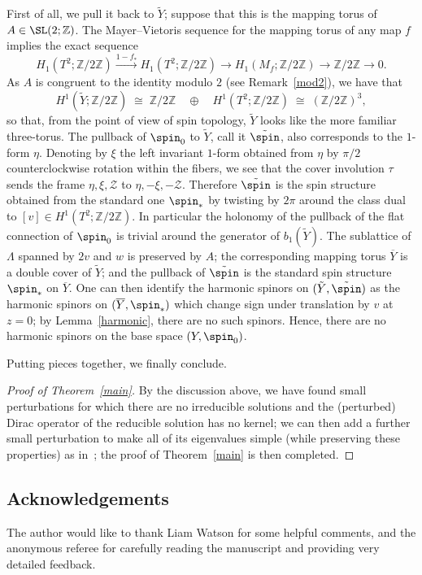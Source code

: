 First of all, we pull it back to $\tilde{Y}$; suppose that this is the mapping torus of $A\in\SL(2;\mathbb{Z})$. The Mayer--Vietoris sequence for the mapping torus of any map $f$ implies the exact sequence
\[
H_1\left(T^2;\mathbb{Z}/2\mathbb{Z}\right)\stackrel{1-f_*}{\rightarrow} H_1\left(T^2;\mathbb{Z}/2\mathbb{Z}\right)\rightarrow H_1\left(M_f;\mathbb{Z}/2\mathbb{Z}\right)\rightarrow \mathbb{Z}/2\mathbb{Z}\rightarrow 0.
\]
As $A$ is congruent to the identity modulo $2$ (see Remark~\ref{mod2}), we have that
\[
H^1\left(\tilde{Y};\mathbb{Z}/2\mathbb{Z}\right)\;\cong\;\mathbb{Z}/2\mathbb{Z}\quad\oplus\quad H^1\left(T^2;\mathbb{Z}/2\mathbb{Z}\right)\;\cong\;(\mathbb{Z}/2\mathbb{Z})^3,
\]
so that, from the point of view of spin topology, $\tilde{Y}$ looks like the more familiar three-torus. The pullback of $\spin_0$ to $\tilde{Y}$, call it $\tilde{\spin}$, also corresponds to the $1$-form $\eta$. Denoting by $\xi$ the left invariant $1$-form obtained from $\eta$ by $\pi/2$ counterclockwise rotation within the fibers, we see that the cover involution $\tau$ sends the frame $\eta,\xi,\mathcal{Z}$ to $\eta,-\xi,-\mathcal{Z}$. Therefore $\tilde{\spin}$ is the spin structure obtained from the standard one $\spin_*$ by twisting by $2\pi$ around the class dual to $[v]\in H^1(T^2;\mathbb{Z}/2\mathbb{Z})$. In particular the holonomy of the pullback of the flat connection of $\spin_0$ is trivial around the generator of $b_1(\tilde{Y})$. The sublattice of $\Lambda$ spanned by $2v$ and $w$ is preserved by $A$; the corresponding mapping torus ${\overline{Y}}$ is a double cover of $\tilde{Y}$; and the pullback of $\tilde{\spin}$ is the standard spin structure $\spin_*$ on ${\overline{Y}}$. One can then identify the harmonic spinors on $(\tilde{Y},\tilde{\spin})$ as the harmonic spinors on $({\overline{Y}},\spin_*)$ which change sign under translation by $v$ at $z=0$; by Lemma~\ref{harmonic}, there are no such spinors. Hence, there are no harmonic spinors on the base space $(Y,\spin_0)$.


Putting pieces together, we finally conclude.


\begin{proof}[Proof of Theorem~\ref{main}]By the discussion above, we have found small perturbations for which there are no irreducible solutions and the (perturbed) Dirac operator of the reducible solution has no kernel; we can then add a further small perturbation to make all of its eigenvalues simple (while preserving these properties) as in~\cite[Chapter~12]{KM}; the proof of Theorem~\ref{main} is then completed.
\end{proof}

\subsection*{Acknowledgements}
The author would like to thank Liam Watson for some helpful comments, and the anonymous referee for carefully reading the manuscript and providing very detailed feedback.

